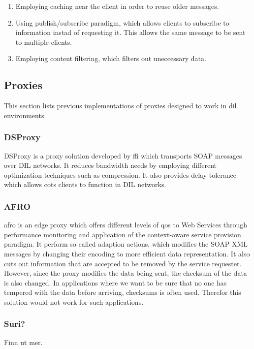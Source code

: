 \documentclass[USenglish]{ifimaster}
\begin{document}
\begin{enumerate}
    \item Employing caching near the client in order to reuse older messages.
    \item Using publish/subscribe paradigm, which allows clients to subscribe to
    information instad of requesting it. This allows the same message to be sent
    to multiple clients.
    \item Employing content filtering, which filters out uneccessary data.
\end{enumerate}


\subsection{Proxies}

This section lists previous implementations of proxies designed to work in
\gls{dil} environments.


\subsubsection{DSProxy}

DSProxy is a proxy solution developed by \gls{ffi} which transports SOAP
messages over DIL networks. It reduces bandwidth needs by employing different
optimization techniques such as compression. It also provides delay tolerance
which allows \gls{cots} clients to function in DIL networks.


\subsubsection{AFRO}

\gls{afro} is an edge proxy which offers different levels of \gls{qos} to Web
Services through performance monitoring and application of the context-aware
service provision paradigm. It perform so called adaption actions, which
modifies the SOAP XML messages by changing their encoding to more efficient data
representation. It also cuts out information that are accepted to be removed by
the service requester. However, since the proxy modifies the data being sent,
the checksum of the data is also changed. In applications where we want to be
sure that no one has tempered with the data before arriving, checksums is often
used. Therefor this solution would not work for such applications.


\subsubsection{Suri?}
Finn ut mer.
\end{document}

